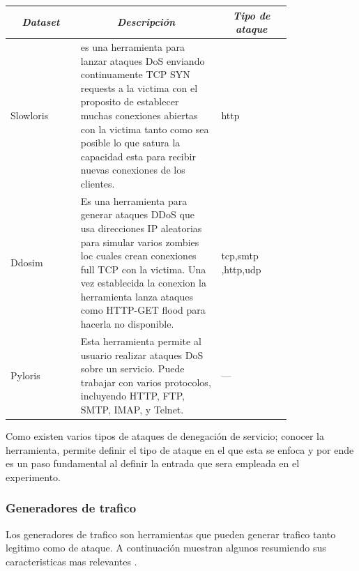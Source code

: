 \documentclass[12pt]{article}
\begin{document}
\begin{table}[htbp]
\centering
\begin{tabular}{|p{0.2\linewidth}|p{0.4\linewidth}|p{0.2\linewidth}|}
\hline
\multicolumn{1}{|c|}{\textit{\textbf{Dataset}}} & \multicolumn{1}{c|}{\textit{\textbf{Descripción}}} & \multicolumn{1}{c|}{\textit{\textbf{Tipo de ataque}}} \tabularnewline \hline
Slowloris & es una herramienta para lanzar ataques DoS enviando continuamente TCP SYN requests a la victima con el proposito de establecer muchas conexiones abiertas con la victima tanto como sea posible lo que satura la capacidad esta para recibir nuevas conexiones de los clientes. & http \tabularnewline \hline
Ddosim & Es una herramienta para generar ataques DDoS que usa direcciones IP aleatorias para simular varios zombies loc cuales crean conexiones full TCP con la victima. Una vez establecida la conexion la herramienta lanza ataques como HTTP-GET flood para hacerla no disponible. & tcp,smtp ,http,udp \tabularnewline \hline
Pyloris & Esta herramienta permite al usuario realizar ataques DoS sobre un servicio. Puede trabajar con varios protocolos, incluyendo HTTP, FTP, SMTP, IMAP, y Telnet. & --- \tabularnewline \hline
\end{tabular}
\end{table}

\FloatBarrier

Como existen varios tipos de ataques de denegación de servicio; conocer la herramienta, permite definir el tipo de ataque en el que esta se enfoca y por ende es un paso fundamental al definir la entrada que sera empleada en el experimento.

\subsubsection{Generadores de trafico}

Los generadores de trafico son herramientas que pueden generar trafico tanto legitimo como de ataque. A continuación muestran algunos resumiendo sus caracteristicas mas relevantes \citep{dos_tools}. 
\end{document}
